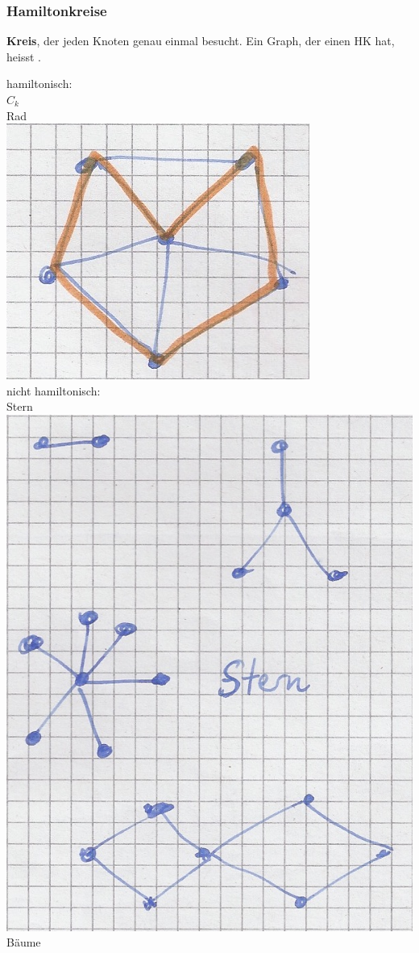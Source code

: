 \subsubsection{Hamiltonkreise}
\begin{def*}[note = Hamiltonkreis (HK) , index = Hamiltonkreis]
	\textbf{Kreis}, der jeden Knoten genau einmal besucht. Ein Graph, der einen HK hat, heisst .
\end{def*}
\begin{bsp*}
	hamiltonisch:\\
	$C_k$ \\
	Rad \\
	\includegraphics{Bild50} \\
	nicht hamiltonisch: \\
	Stern \\
	\includegraphics{Bild51} \\
	Bäume
\end{bsp*}
